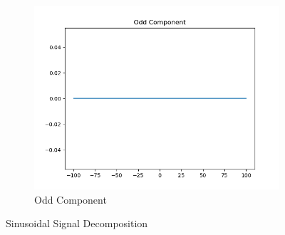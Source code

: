 \documentclass[10pt,a4paper, margin=1in]{article}
\begin{document}
\begin{enumerate}
\begin{enumerate}
\begin{figure}[h]
\begin{subfigure}[t]{0.3\linewidth}
    \end{subfigure}
    \begin{subfigure}[t]{0.3\linewidth}
    \centering
        \caption{Odd Component}
        \includegraphics[width=1\linewidth]{assets/q7a/sine_part_a_odd.png}
    \end{subfigure}
    \caption{Sinusoidal Signal Decomposition}
\end{figure}


\end{enumerate}
\end{enumerate}
\end{document}
